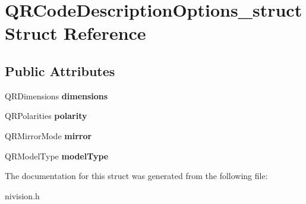 \hypertarget{structQRCodeDescriptionOptions__struct}{
\section{QRCodeDescriptionOptions\_\-struct Struct Reference}
\label{structQRCodeDescriptionOptions__struct}
}
\subsection*{Public Attributes}
\begin{DoxyCompactItemize}
\item 
\hypertarget{structQRCodeDescriptionOptions__struct_aa7c7e967c6e1e3b3367ff7e78f518d68}{
QRDimensions {\bfseries dimensions}}
\label{structQRCodeDescriptionOptions__struct_aa7c7e967c6e1e3b3367ff7e78f518d68}

\item 
\hypertarget{structQRCodeDescriptionOptions__struct_a69584139380a667876d13334a392c54f}{
QRPolarities {\bfseries polarity}}
\label{structQRCodeDescriptionOptions__struct_a69584139380a667876d13334a392c54f}

\item 
\hypertarget{structQRCodeDescriptionOptions__struct_a7864263be3f3c7d7cf3e341eafdfd213}{
QRMirrorMode {\bfseries mirror}}
\label{structQRCodeDescriptionOptions__struct_a7864263be3f3c7d7cf3e341eafdfd213}

\item 
\hypertarget{structQRCodeDescriptionOptions__struct_a094c0cbfe0f989f0534a45d89d3172ff}{
QRModelType {\bfseries modelType}}
\label{structQRCodeDescriptionOptions__struct_a094c0cbfe0f989f0534a45d89d3172ff}

\end{DoxyCompactItemize}


The documentation for this struct was generated from the following file:\begin{DoxyCompactItemize}
\item 
nivision.h\end{DoxyCompactItemize}
